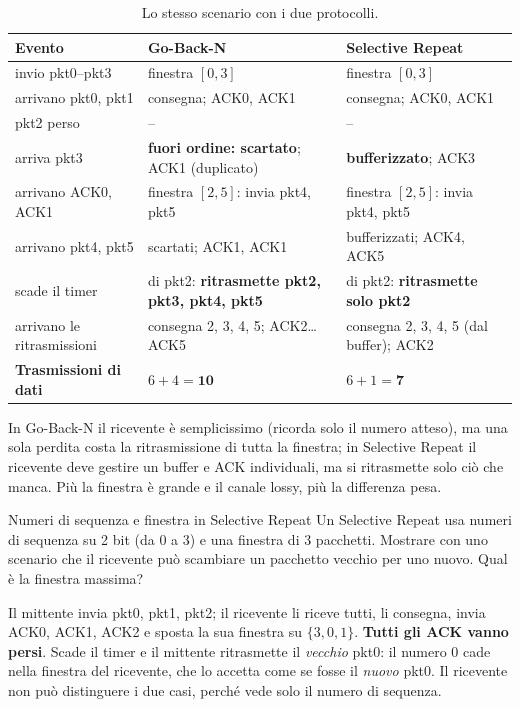 \svolgimento
\begin{table}[H]
\centering
\small
\begin{tabular}{p{4.3cm}p{5.2cm}p{5.2cm}}
\toprule
\textbf{Evento} & \textbf{Go-Back-N} & \textbf{Selective Repeat} \\
\midrule
invio pkt0--pkt3 & finestra $[0,3]$ & finestra $[0,3]$ \\
arrivano pkt0, pkt1 & consegna; ACK0, ACK1 & consegna; ACK0, ACK1 \\
pkt2 perso & -- & -- \\
arriva pkt3 & \textbf{fuori ordine: scartato}; ACK1 (duplicato) & \textbf{bufferizzato}; ACK3 \\
arrivano ACK0, ACK1 & finestra $[2,5]$: invia pkt4, pkt5 & finestra $[2,5]$: invia pkt4, pkt5 \\
arrivano pkt4, pkt5 & scartati; ACK1, ACK1 & bufferizzati; ACK4, ACK5 \\
scade il timer & di pkt2: \textbf{ritrasmette pkt2, pkt3, pkt4, pkt5} & di pkt2: \textbf{ritrasmette solo pkt2} \\
arrivano le ritrasmissioni & consegna 2, 3, 4, 5; ACK2\dots ACK5 & consegna 2, 3, 4, 5 (dal buffer); ACK2 \\
\midrule
\textbf{Trasmissioni di dati} & $6 + 4 = \mathbf{10}$ & $6 + 1 = \mathbf{7}$ \\
\bottomrule
\end{tabular}
\caption{Lo stesso scenario con i due protocolli.}
\end{table}

In Go-Back-N il ricevente è semplicissimo (ricorda solo il numero atteso), ma una sola perdita costa la ritrasmissione di
tutta la finestra; in Selective Repeat il ricevente deve gestire un buffer e ACK individuali, ma si ritrasmette solo ciò che
manca. Più la finestra è grande e il canale lossy, più la differenza pesa.

\begin{esercizio}{Numeri di sequenza e finestra in Selective Repeat}
Un Selective Repeat usa numeri di sequenza su 2 bit (da 0 a 3) e una finestra di 3 pacchetti. Mostrare con uno scenario che il
ricevente può scambiare un pacchetto vecchio per uno nuovo. Qual è la finestra massima?
\end{esercizio}

\svolgimento
Il mittente invia pkt0, pkt1, pkt2; il ricevente li riceve tutti, li consegna, invia ACK0, ACK1, ACK2 e sposta la sua finestra
su $\{3, 0, 1\}$. \textbf{Tutti gli ACK vanno persi}. Scade il timer e il mittente ritrasmette il \emph{vecchio} pkt0: il numero 0
cade nella finestra del ricevente, che lo accetta come se fosse il \emph{nuovo} pkt0. Il ricevente non può distinguere i due casi,
perché vede solo il numero di sequenza.

